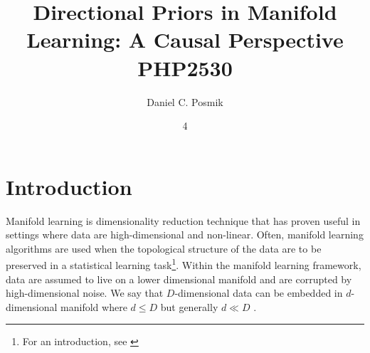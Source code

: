 \documentclass[twoside,11pt]{article}
\begin{document}
\title{	Directional Priors in Manifold Learning: A Causal Perspective \\
\vspace{.1in}
PHP2530			
}

\author{ Daniel C. Posmik }

\maketitle
\date{4 }

\section{Introduction} \label{sc:intro}

Manifold learning is dimensionality reduction technique that has proven useful in settings where data are high-dimensional and non-linear. Often, manifold learning algorithms are used when the topological structure of the data are to be preserved in a statistical learning task\footnote{For an introduction, see \citet{Meila2023}}. Within the manifold learning framework, data are assumed to live on a lower dimensional manifold and are corrupted by high-dimensional noise. We say that $D$-dimensional data can be embedded in $d$-dimensional manifold where $d \leq D$ but generally $d \ll D$ .  
\end{document}
